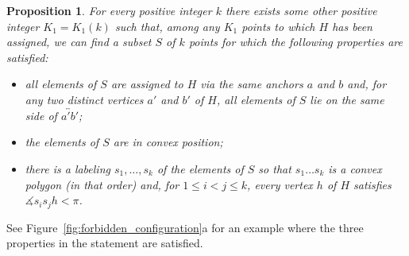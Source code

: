 \documentclass[12pt,reqno, a4paper]{amsart}
\newcounter{contSect} \numberwithin{contSect}{section}
\newtheorem{proposition}[contSect]{Proposition}
\begin{document}
\begin{proposition}\label{prop:first_structure}
For every positive integer $k$ there exists some other positive integer $K_1=K_1(k)$ such that, among any $K_1$ points to which $H$ has been assigned, we can find a subset $S$ of $k$ points for which the following properties are satisfied:
\begin{itemize}
    \item all elements of $S$ are assigned to $H$ via the same anchors $a$ and $b$ and, for any two distinct vertices $a'$ and $b'$ of $H$, all elements of $S$ lie on the same side of $\overleftrightarrow{a'b'}$;

    \item the elements of $S$ are in convex position;

    \item there is a labeling $s_1,\dots,s_{k}$ of the elements of $S$ so that $s_1\dots s_k$ is a convex polygon (in that order) and, for $1\leq i<j\leq k$, every vertex $h$ of $H$ satisfies $\measuredangle s_is_jh<\pi$.
\end{itemize}
\end{proposition}

See Figure~\ref{fig:forbidden_configuration}a for an example where the three properties in the statement are satisfied.
\end{document}
